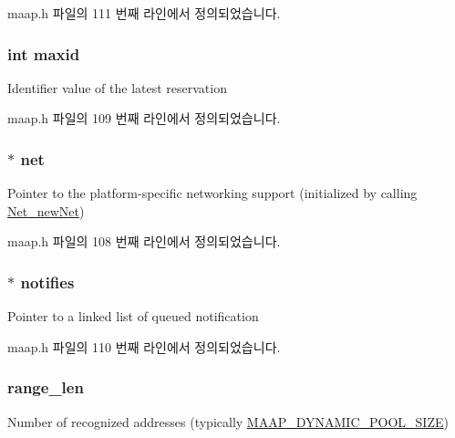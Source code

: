 maap.\+h 파일의 111 번째 라인에서 정의되었습니다.

\subsubsection[{\texorpdfstring{maxid}{maxid}}]{\setlength{\rightskip}{0pt plus 5cm}int maxid}\hypertarget{struct_maap___client_adf2905c4b99c43f87a111e240a32932b}{}\label{struct_maap___client_adf2905c4b99c43f87a111e240a32932b}
Identifier value of the latest reservation 

maap.\+h 파일의 109 번째 라인에서 정의되었습니다.

\subsubsection[{\texorpdfstring{net}{net}}]{$\ast$ net}\hypertarget{struct_maap___client_a504c73ff1a68c50e5435dece66bc2772}{}\label{struct_maap___client_a504c73ff1a68c50e5435dece66bc2772}
Pointer to the platform-\/specific networking support (initialized by calling \hyperlink{maap__net_8h_a99aac24b70bfd73e186e558457d9909f}{Net\+\_\+new\+Net}) 

maap.\+h 파일의 108 번째 라인에서 정의되었습니다.

\subsubsection[{\texorpdfstring{notifies}{notifies}}]{$\ast$ notifies}\hypertarget{struct_maap___client_a898d3392eb9ff64e224e8fb47d4f59fc}{}\label{struct_maap___client_a898d3392eb9ff64e224e8fb47d4f59fc}
Pointer to a linked list of queued notification 

maap.\+h 파일의 110 번째 라인에서 정의되었습니다.

\subsubsection[{\texorpdfstring{range\+\_\+len}{range_len}}]{ range\+\_\+len}\hypertarget{struct_maap___client_aa1f919567122a4029070948bdfdcf2a3}{}\label{struct_maap___client_aa1f919567122a4029070948bdfdcf2a3}
Number of recognized addresses (typically \hyperlink{openavb__endpoint__osal__maap_8c_a27db04878ffebe92dbbcbae7e7c5d447}{M\+A\+A\+P\+\_\+\+D\+Y\+N\+A\+M\+I\+C\+\_\+\+P\+O\+O\+L\+\_\+\+S\+I\+ZE}) 

